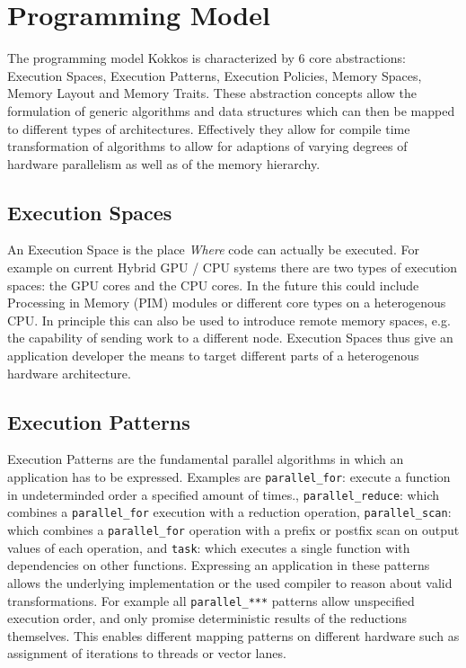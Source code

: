 
\section{Programming Model}

The programming model Kokkos is characterized by 6 core abstractions: Execution Spaces, Execution Patterns, Execution Policies, Memory Spaces, Memory Layout and Memory Traits. 
These abstraction concepts allow the formulation of generic algorithms and data structures which can then be mapped to different types of architectures. 
Effectively they allow for compile time transformation of algorithms to allow for adaptions of varying degrees of hardware parallelism as well as of the memory hierarchy. 

\subsection{Execution Spaces}

An Execution Space is the place {\it Where} code can actually be executed. 
For example on current Hybrid GPU / CPU systems there are two types of execution spaces: the GPU cores and the CPU cores. 
In the future this could include Processing in Memory (PIM) modules or different core types on a heterogenous CPU.
In principle this can also be used to introduce remote memory spaces, e.g. the capability of sending work to a different node.
Execution Spaces thus give an application developer the means to target different parts of a heterogenous hardware architecture.

\subsection{Execution Patterns}

Execution Patterns are the fundamental parallel algorithms in which an application has to be expressed.
Examples are \lstinline|parallel_for|: execute a function in undeterminded order a specified amount of times.,
\lstinline|parallel_reduce|: which combines a \lstinline|parallel_for| execution with a reduction operation,
\lstinline|parallel_scan|: which combines a \lstinline|parallel_for| operation with a prefix or postfix scan on output values of each operation, and
\lstinline|task|: which executes a single function with dependencies on other functions.
Expressing an application in these patterns allows the underlying implementation or the used compiler to reason about valid transformations.
For example all \lstinline|parallel_***| patterns allow unspecified execution order, and only promise deterministic results of the reductions themselves.
This enables different mapping patterns on different hardware such as assignment of iterations to threads or vector lanes. 

